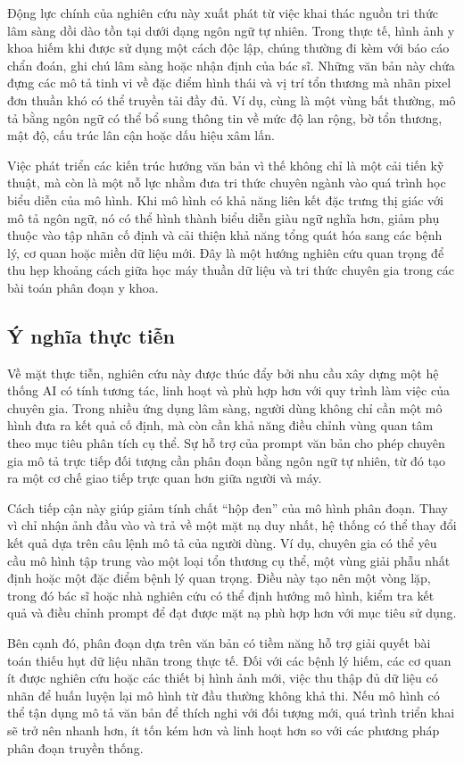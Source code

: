     Động lực chính của nghiên cứu này xuất phát từ việc khai thác nguồn tri thức lâm sàng dồi dào tồn tại dưới dạng ngôn ngữ tự nhiên. Trong thực tế, hình ảnh y khoa hiếm khi được sử dụng một cách độc lập, chúng thường đi kèm với báo cáo chẩn đoán, ghi chú lâm sàng hoặc nhận định của bác sĩ. Những văn bản này chứa đựng các mô tả tinh vi về đặc điểm hình thái và vị trí tổn thương mà nhãn pixel đơn thuần khó có thể truyền tải đầy đủ. Ví dụ, cùng là một vùng bất thường, mô tả bằng ngôn ngữ có thể bổ sung thông tin về mức độ lan rộng, bờ tổn thương, mật độ, cấu trúc lân cận hoặc dấu hiệu xâm lấn.

    Việc phát triển các kiến trúc hướng văn bản vì thế không chỉ là một cải tiến kỹ thuật, mà còn là một nỗ lực nhằm đưa tri thức chuyên ngành vào quá trình học biểu diễn của mô hình. Khi mô hình có khả năng liên kết đặc trưng thị giác với mô tả ngôn ngữ, nó có thể hình thành biểu diễn giàu ngữ nghĩa hơn, giảm phụ thuộc vào tập nhãn cố định và cải thiện khả năng tổng quát hóa sang các bệnh lý, cơ quan hoặc miền dữ liệu mới. Đây là một hướng nghiên cứu quan trọng để thu hẹp khoảng cách giữa học máy thuần dữ liệu và tri thức chuyên gia trong các bài toán phân đoạn y khoa.

\subsection{Ý nghĩa thực tiễn}
    Về mặt thực tiễn, nghiên cứu này được thúc đẩy bởi nhu cầu xây dựng một hệ thống AI có tính tương tác, linh hoạt và phù hợp hơn với quy trình làm việc của chuyên gia. Trong nhiều ứng dụng lâm sàng, người dùng không chỉ cần một mô hình đưa ra kết quả cố định, mà còn cần khả năng điều chỉnh vùng quan tâm theo mục tiêu phân tích cụ thể. Sự hỗ trợ của prompt văn bản cho phép chuyên gia mô tả trực tiếp đối tượng cần phân đoạn bằng ngôn ngữ tự nhiên, từ đó tạo ra một cơ chế giao tiếp trực quan hơn giữa người và máy.

    Cách tiếp cận này giúp giảm tính chất ``hộp đen'' của mô hình phân đoạn. Thay vì chỉ nhận ảnh đầu vào và trả về một mặt nạ duy nhất, hệ thống có thể thay đổi kết quả dựa trên câu lệnh mô tả của người dùng. Ví dụ, chuyên gia có thể yêu cầu mô hình tập trung vào một loại tổn thương cụ thể, một vùng giải phẫu nhất định hoặc một đặc điểm bệnh lý quan trọng. Điều này tạo nên một vòng lặp, trong đó bác sĩ hoặc nhà nghiên cứu có thể định hướng mô hình, kiểm tra kết quả và điều chỉnh prompt để đạt được mặt nạ phù hợp hơn với mục tiêu sử dụng.

    Bên cạnh đó, phân đoạn dựa trên văn bản có tiềm năng hỗ trợ giải quyết bài toán thiếu hụt dữ liệu nhãn trong thực tế. Đối với các bệnh lý hiếm, các cơ quan ít được nghiên cứu hoặc các thiết bị hình ảnh mới, việc thu thập đủ dữ liệu có nhãn để huấn luyện lại mô hình từ đầu thường không khả thi. Nếu mô hình có thể tận dụng mô tả văn bản để thích nghi với đối tượng mới, quá trình triển khai sẽ trở nên nhanh hơn, ít tốn kém hơn và linh hoạt hơn so với các phương pháp phân đoạn truyền thống.

